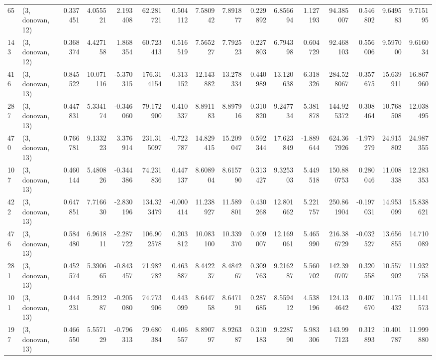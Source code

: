 \begin{tabular}{llrrrrrrrrrrrrrr}
65  &  (3, donovan, 12) &   0.337451 &   4.055521 &   2.193408 &    62.281721 &   0.504112 &   7.580942 &   7.891877 &  0.229892 &   6.856694 &   1.127193 &    94.385007 &  0.546802 &   9.649583 &   9.715195 \\
143 &  (3, donovan, 12) &   0.368374 &   4.427158 &   1.868354 &    60.723413 &   0.516519 &   7.565227 &   7.792523 &  0.227803 &   6.794398 &   0.604729 &    92.468103 &  0.556006 &   9.597000 &   9.616034 \\
416 &  (3, donovan, 13) &   0.845522 &  10.071116 &  -5.370315 &   176.314154 &  -0.313152 &  12.143882 &  13.278334 &  0.440989 &  13.120638 &   6.318326 &   284.528067 & -0.357675 &  15.639911 &  16.867960 \\
287 &  (3, donovan, 13) &   0.447831 &   5.334174 &  -0.346060 &    79.172900 &   0.410337 &   8.891183 &   8.897916 &  0.310820 &   9.247734 &   5.381878 &   144.925372 &  0.308464 &  10.768508 &  12.038495 \\
470 &  (3, donovan, 13) &   0.766781 &   9.133223 &   3.376914 &   231.315097 &  -0.722787 &  14.829415 &  15.209047 &  0.592344 &  17.623849 &  -1.889644 &   624.367926 & -1.979279 &  24.915802 &  24.987355 \\
107 &  (3, donovan, 13) &   0.460144 &   5.480826 &  -0.344386 &    74.231836 &   0.447137 &   8.608904 &   8.615790 &  0.313427 &   9.325303 &   5.449518 &   150.880753 &  0.280046 &  11.008338 &  12.283353 \\
422 &  (3, donovan, 13) &   0.647851 &   7.716630 &  -2.830196 &   134.323479 &  -0.000414 &  11.238927 &  11.589801 &  0.430268 &  12.801662 &   5.221757 &   250.861904 & -0.197031 &  14.953099 &  15.838621 \\
476 &  (3, donovan, 13) &   0.584480 &   6.961811 &  -2.287722 &   106.902578 &   0.203812 &  10.083100 &  10.339370 &  0.409007 &  12.169061 &   5.465990 &   216.386729 & -0.032527 &  13.656855 &  14.710089 \\
281 &  (3, donovan, 13) &   0.452574 &   5.390665 &  -0.843457 &    71.982782 &   0.463887 &   8.442237 &   8.484267 &  0.309763 &   9.216287 &   5.560702 &   142.390707 &  0.320558 &  10.557902 &  11.932758 \\
101 &  (3, donovan, 13) &   0.444231 &   5.291287 &  -0.205080 &    74.773906 &   0.443099 &   8.644758 &   8.647191 &  0.287685 &   8.559412 &   4.538196 &   124.134642 &  0.407670 &  10.175432 &  11.141573 \\
197 &  (3, donovan, 13) &   0.466550 &   5.557129 &  -0.796313 &    79.680384 &   0.406557 &   8.890797 &   8.926387 &  0.310183 &   9.228790 &   5.983306 &   143.997123 &  0.312893 &  10.401787 &  11.999880 \\

\end{tabular}
